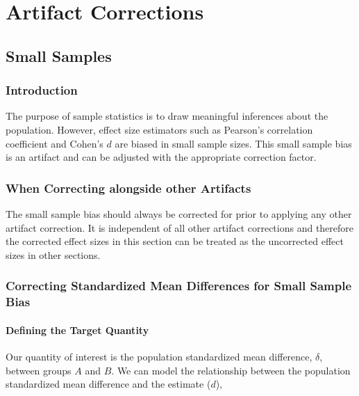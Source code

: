 \documentclass[
  letterpaper,
  DIV=11,
  numbers=noendperiod]{scrreprt}
\begin{document}
\part{Artifact Corrections}

\hypertarget{small-samples}{%
\chapter{Small Samples}\label{small-samples}}

\hypertarget{introduction}{%
\section{Introduction}\label{introduction}}

The purpose of sample statistics is to draw meaningful inferences about
the population. However, effect size estimators such as Pearson's
correlation coefficient and Cohen's \(d\) are biased in small sample
sizes. This small sample bias is an artifact and can be adjusted with
the appropriate correction factor.

\hypertarget{when-correcting-alongside-other-artifacts}{%
\section{When Correcting alongside other
Artifacts}\label{when-correcting-alongside-other-artifacts}}

The small sample bias should always be corrected for prior to applying
any other artifact correction. It is independent of all other artifact
corrections and therefore the corrected effect sizes in this section can
be treated as the uncorrected effect sizes in other sections.

\hypertarget{correcting-standardized-mean-differences-for-small-sample-bias}{%
\section{Correcting Standardized Mean Differences for Small Sample
Bias}\label{correcting-standardized-mean-differences-for-small-sample-bias}}

\hypertarget{defining-the-target-quantity}{%
\subsection{Defining the Target
Quantity}\label{defining-the-target-quantity}}

Our quantity of interest is the population standardized mean difference,
\(\delta\), between groups \(A\) and \(B\). We can model the
relationship between the population standardized mean difference and the
estimate (\(d\)),
\end{document}
